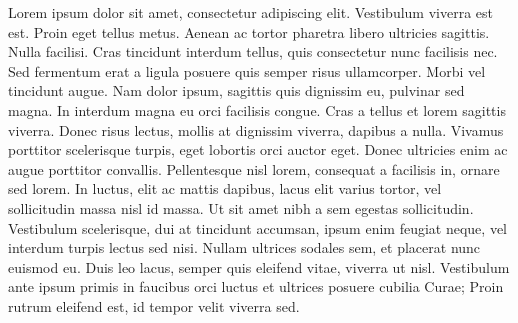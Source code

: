 \documentclass[graybox,natbib]{svmult}
\begin{document}
Lorem ipsum dolor sit amet, consectetur adipiscing elit. Vestibulum
viverra est est. Proin eget tellus metus. Aenean ac tortor pharetra
libero ultricies sagittis. Nulla facilisi. Cras tincidunt interdum
tellus, quis consectetur nunc facilisis nec. Sed fermentum erat a ligula
posuere quis semper risus ullamcorper. Morbi vel tincidunt augue. Nam
dolor ipsum, sagittis quis dignissim eu, pulvinar sed magna. In interdum
magna eu orci facilisis congue. Cras a tellus et lorem sagittis viverra.
Donec risus lectus, mollis at dignissim viverra, dapibus a nulla.
Vivamus porttitor scelerisque turpis, eget lobortis orci auctor eget.
Donec ultricies enim ac augue porttitor convallis. Pellentesque nisl
lorem, consequat a facilisis in, ornare sed lorem. In luctus, elit ac
mattis dapibus, lacus elit varius tortor, vel sollicitudin massa nisl id
massa. Ut sit amet nibh a sem egestas sollicitudin. Vestibulum
scelerisque, dui at tincidunt accumsan, ipsum enim feugiat neque, vel
interdum turpis lectus sed nisi. Nullam ultrices sodales sem, et
placerat nunc euismod eu. Duis leo lacus, semper quis eleifend vitae,
viverra ut nisl. Vestibulum ante ipsum primis in faucibus orci luctus et
ultrices posuere cubilia Curae; Proin rutrum eleifend est, id tempor
velit viverra sed.





\end{document}
